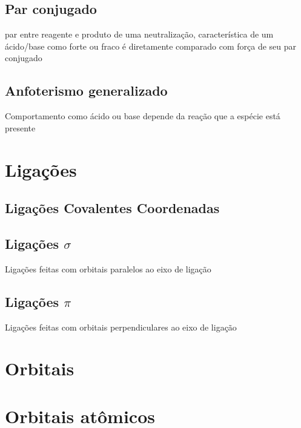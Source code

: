 \documentclass{article}
\begin{document}
\subsection{Par conjugado}
par entre reagente e produto de uma neutralização, característica de um ácido/base como forte ou fraco é diretamente comparado com força de seu par conjugado

\subsection{Anfoterismo generalizado}
Comportamento como ácido ou base depende da reação que a espécie está presente

\section{Ligações}

\subsection{Ligações Covalentes Coordenadas}
\label{Background - ligacoes covalentes coordenadas}

\begin{multicols}{2}

\subsection{Ligações {\boldmath\bfseries$\sigma$}}
\label{ligacao sigma}
Ligações feitas com orbitais paralelos ao eixo de ligação

\subsection{Ligações {\boldmath\bfseries$\pi$}}
\label{ligacao pi}
Ligações feitas com orbitais perpendiculares ao eixo de ligação

\end{multicols}

\section*{Orbitais}
\section{Orbitais atômicos}
\label{oa}
\end{document}
